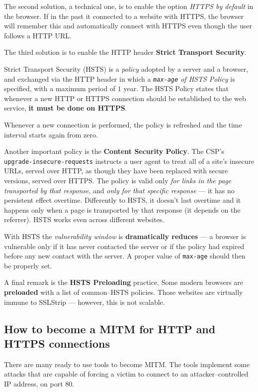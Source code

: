\documentclass[10pt]{extreport}
\begin{document}
The second solution, a technical one, is to enable the option \emph{HTTPS by
default} in the browser. If in the past it connected to a website with HTTPS,
the browser will remember this and automatically connect with HTTPS even though
the user follows a HTTP URL.

The third solution is to enable the HTTP header \textbf{Strict Transport
Security}.

Strict Transport Security (HSTS) is a \emph{policy} adopted by a server and a
browser, and exchanged via the HTTP header in which a \emph{\texttt{max-age} of
HSTS Policy} is specified, with a maximum period of $1$ year. The HSTS Policy
states that whenever a new HTTP or HTTPS connection should be established to the
web service, \textbf{it must be done on HTTPS}.

Whenever a new connection is performed, the policy is refreshed and the time
interval starts again from zero.

Another important policy is the \textbf{Content Security Policy}. The CSP's
\texttt{upgrade\--insecure\--requests} instructs a user agent to treat all of a
site's insecure URLs, served over HTTP, as though they have been replaced with
secure versions, served over HTTPS. The policy is valid only \emph{for links in
the page transported by that response}, and \emph{only for that specific
response} --- it has no persistent effect overtime. Differently to HSTS, it
doesn't last overtime and it happens only when a page is transported by that
response (it depends on the referrer). HSTS works even across different
websites.

With HSTS the \emph{vulnerability window} is \textbf{dramatically reduces} --- a
browser is vulnerable only if it has never contacted the server or if the
policy had expired before any new contact with the server. A proper value of
\texttt{max-age} should then be properly set.

A final remark is the \textbf{HSTS Preloading} practice. Some modern browsers
are \textbf{preloaded} with a list of common--HSTS policies. Those websites are
virtually immune to SSLStrip --- however, this is not scalable.

\subsection{How to become a MITM for HTTP and HTTPS connections}

There are many ready to use tools to become MITM. The tools implement some
attacks that are capable of forcing a victim to connect to an
attacker--controlled IP address, on port $80$.
\end{document}
